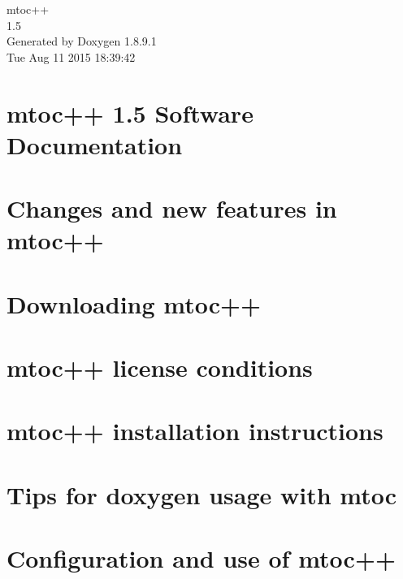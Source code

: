 \documentclass[twoside]{article}
\newcommand{\+}{\discretionary{\mbox{\scriptsize$\hookleftarrow$}}{}{}}
\begin{document}
\hypersetup{pageanchor=false,
             bookmarks=true,
             bookmarksnumbered=true,
             pdfencoding=unicode
            }
\begin{titlepage}
\vspace*{7cm}
\begin{center}%
{\Large mtoc++ \\[1ex]\large 1.\+5 }\\
\vspace*{1cm}
{\large Generated by Doxygen 1.8.9.1}\\
\vspace*{0.5cm}
{\small Tue Aug 11 2015 18:39:42}\\
\end{center}
\end{titlepage}
\tableofcontents
{}
\hypersetup{pageanchor=true}

\section{mtoc++ 1.5 Software Documentation}
\label{index}\hypertarget{index}{}
\section{Changes and new features in mtoc++}
\label{changes}
\hypertarget{changes}{}

\section{Downloading mtoc++}
\label{download}
\hypertarget{download}{}

\section{mtoc++ license conditions}
\label{licensing}
\hypertarget{licensing}{}

\section{mtoc++ installation instructions}
\label{install}
\hypertarget{install}{}

\section{Tips for doxygen usage with mtoc}
\label{tips}
\hypertarget{tips}{}

\section{Configuration and use of mtoc++}
\label{tools}
\hypertarget{tools}{}

\end{document}
